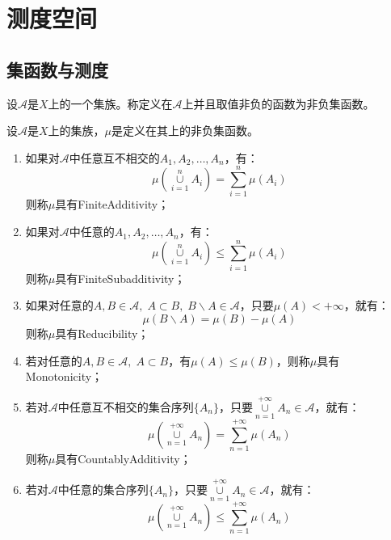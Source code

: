 \section{测度空间}
\subsection{集函数与测度}
\begin{definition}
	设$\mathscr{A}$是$X$上的一个集族。称定义在$\mathscr{A}$上并且取值非负的函数为非负集函数。
\end{definition}
\begin{definition}
	设$\mathscr{A}$是$X$上的集族，$\mu$是定义在其上的非负集函数。
	\begin{enumerate}
		\item 如果对$\mathscr{A}$中任意互不相交的$A_1,A_2,\dots,A_n$，有：
		\begin{equation*}
			\mu\left(\underset{i=1}{\overset{n}{\cup}}A_i\right)=\sum_{i=1}^{n}\mu(A_i)
		\end{equation*}
		则称$\mu$具有\gls{FiniteAdditivity}；
		\item 如果对$\mathscr{A}$中任意的$A_1,A_2,\dots,A_n$，有：
		\begin{equation*}
			\mu\left(\underset{i=1}{\overset{n}{\cup}}A_i\right)\leqslant\sum_{i=1}^{n}\mu(A_i)
		\end{equation*}
		则称$\mu$具有\gls{FiniteSubadditivity}；
		\item 如果对任意的$A,B\in\mathscr{A},\;A\subset B,\;B\backslash A\in\mathscr{A}$，只要$\mu(A)<+\infty$，就有：
		\begin{equation*}
			\mu(B\backslash A)=\mu(B)-\mu(A)
		\end{equation*}
		则称$\mu$具有\gls{Reducibility}；
		\item 若对任意的$A,B\in\mathscr{A},\;A\subset B$，有$\mu(A)\leqslant\mu(B)$，则称$\mu$具有\gls{Monotonicity}；
		\item 若对$\mathscr{A}$中任意互不相交的集合序列$\{A_n\}$，只要$\underset{n=1}{\overset{+\infty}{\cup}}A_n\in\mathscr{A}$，就有：
		\begin{equation*}
			\mu\left(\underset{n=1}{\overset{+\infty}{\cup}}A_n\right)=\sum_{n=1}^{+\infty}\mu(A_n)
		\end{equation*}
		则称$\mu$具有\gls{CountablyAdditivity}；
		\item 若对$\mathscr{A}$中任意的集合序列$\{A_n\}$，只要$\underset{n=1}{\overset{+\infty}{\cup}}A_n\in\mathscr{A}$，就有：
		\begin{equation*}
			\mu\left(\underset{n=1}{\overset{+\infty}{\cup}}A_n\right)\leqslant\sum_{n=1}^{+\infty}\mu(A_n)

\end{equation*}
\end{enumerate}
\end{definition}
